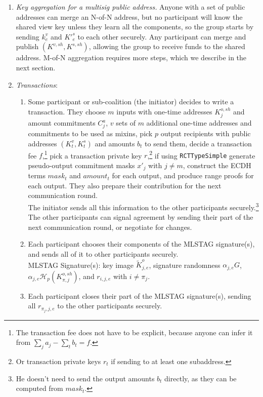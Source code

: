 \begin{enumerate}
    \item {\it Key aggregation for a multisig public address.} Anyone with a set of public addresses can merge an N-of-N address, but no participant will know the shared view key unless they learn all the components, so the group starts by sending $k^{v}_e$ and $K'^{s}_e$ to each other securely. Any participant can merge and publish $(K^{v,sh},K^{s,sh})$, allowing the group to receive funds to the shared address. M-of-N aggregation requires more steps, which we describe in the next section.
    \item {\it Transactions}:
    \begin{enumerate}
        \item Some participant or sub-coalition (the initiator) decides to write a transaction. They choose $m$ inputs with one-time addresses $K^{o,sh}_{j}$ and amount commitments $C^a_j$, $v$ sets of $m$ additional one-time addresses and commitments to be used as mixins, pick $p$ output recipients with public addresses $(K^v_t,K^s_t)$ and amounts $b_t$ to send them, decide a transaction fee $f$,\footnote{The transaction fee does not have to be explicit, because anyone can infer it from $\sum_j a_j - \sum_t b_t = f$.} pick a transaction private key $r$,\footnote{Or transaction private keys $r_{t}$ if sending to at least one subaddress.} if using {\tt RCTTypeSimple} generate pseudo-output commitment masks $x'_{j}$ with $j \neq m$, construct the ECDH terms $\mathit{mask}_t$ and $\mathit{amount}_t$ for each output, and produce range proofs for each output. They also prepare their contribution for the next communication round.\\
        
        The initiator sends all this information to the other participants securely.\footnote{He doesn't need to send the output amounts $b_t$ directly, as they can be computed from $\mathit{mask}_t$.} The other participants can signal agreement by sending their part of the next communication round, or negotiate for changes.
        \item Each participant chooses their components of the MLSTAG signature(s), and sends all of it to other participants securely.\\
        
        MLSTAG Signature(s): key image $\tilde{K}^{o}_{j,e}$, signature randomness $\alpha_{j,e} G$, $\alpha_{j,e} \mathcal{H}_p(K^{o,sh}_{\pi,j})$, and $r_{i,j,e}$ with $i \neq \pi_j$.
        \item Each participant closes their part of the MLSTAG signature(s), sending all $r_{{\pi_j},j,e}$ to the other participants securely.
    \end{enumerate}
\end{enumerate}

